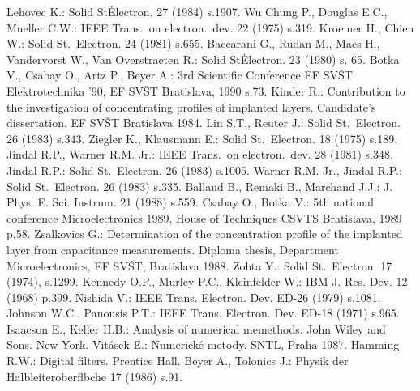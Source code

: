 \begin{thebibliography}{}
 Lehovec K.: Solid St\.  Electron.  27 (1984)
  s.1907.
 Wu Chung P., Douglas E.C., Mueller C.W.: IEEE
  Trans.\ on electron.\ dev. 22 (1975) s.319.
 Kroemer H., Chien W.: Solid St.\ Electron. 24
  (1981) s.655.
 Baccarani G., Rudan M., Maes H., Vandervorst W.,
  Van Overstraeten R.: Solid St\. Electron. 23 (1980) s. 65.
 Botka V., Csabay O., Artz P., Beyer A.: 3rd
  Scientific Conference EF SVŠT Elektrotechnika '90, EF SVŠT
  Bratislava, 1990 s.73.
 Kinder R.: Contribution to the investigation of
  concentrating profiles of implanted layers. Candidate's
  dissertation. EF SVŠT Bratislava 1984.
 Lin S.T., Reuter J.: Solid St.\ Electron. 26 (1983)
  s.343.
 Ziegler K., Klausmann E.: Solid St.\ Electron. 18
  (1975) s.189.
 Jindal R.P., Warner R.M. Jr.: IEEE Trans.\ on
  electron.\ dev. 28 (1981) s.348.
 Jindal R.P.: Solid St.\ Electron. 26 (1983)
  s.1005.
 Warner R.M. Jr., Jindal R.P.: Solid
  St.\ Electron. 26 (1983) s.335.
 Balland B., Remaki B., Marchand J.J.:
  J. Phys. E. Sci. Instrum. 21 (1988) s.559.
 Csabay O., Botka V.: 5th national conference
  Microelectronics 1989, House of Techniques CSVTS Bratislava, 1989
  p.58.
 Zsalkovics G.: Determination of the concentration
  profile of the implanted layer from capacitance
  measurements. Diploma thesis, Department Microelectronics, EF SVŠT,
  Bratislava 1988.
 Zohta Y.: Solid St.\ Electron. 17 (1974), s.1299.
 Kennedy O.P., Murley P.C., Kleinfelder W.: IBM
  J. Res. Dev. 12 (1968) p.399.
 Nishida V.: IEEE Trans. Electron. Dev. ED-26
  (1979) s.1081.
 Johnson W.C., Panousis P.T.: IEEE
  Trans. Electron. Dev. ED-18 (1971) s.965.
 Isaacson E., Keller H.B.: Analysis of numerical
  memethods.  John Wiley and Sons. New York.
 Vitásek E.: Numerické metody. SNTL, Praha 1987.
 Hamming R.W.: Digital filters. Prentice Hall.
 Beyer A., Tolonics J.: Physik der
  Halbleiteroberflbche 17 (1986) s.91.
\end{thebibliography}
